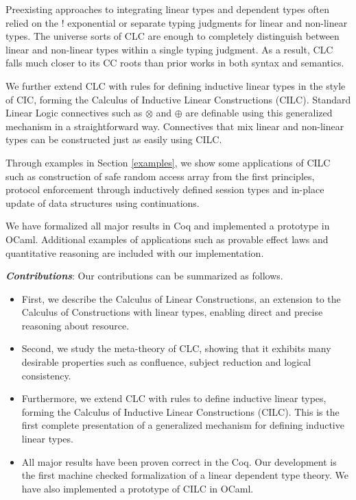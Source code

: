\documentclass[sigplan,screen,review,anonymous]{acmart}
\begin{document}
Preexisting approaches to integrating linear types and dependent types often relied on the ! exponential or separate typing judgments for linear and non-linear types. The universe sorts of CLC are enough to completely distinguish between linear and non-linear types within a single typing judgment. As a result, CLC falls much closer to its CC roots than prior works in both syntax and semantics.

We further extend CLC with rules for defining inductive linear types in the style of CIC, forming the Calculus of Inductive Linear Constructions (CILC). Standard Linear Logic connectives such as $\otimes$ and $\oplus$ are definable using this generalized mechanism in a straightforward way. Connectives that mix linear and non-linear types can be constructed just as easily using CILC.

Through examples in Section \ref{examples}, we show some applications of CILC such as construction of safe random access array from the first principles, protocol enforcement through inductively defined session types and in-place update of data structures using continuations.

We have formalized all major results in Coq and implemented a prototype in OCaml. Additional examples of applications such as provable effect laws and quantitative reasoning are included with our implementation.

\vspace{4pt}
\noindent \textbf{\textit{Contributions}}:
Our contributions can be summarized as follows.
\begin{itemize}
  \item First, we describe the Calculus of Linear Constructions, an extension to the Calculus of Constructions with linear types, enabling direct and precise reasoning about resource.
  \item Second, we study the meta-theory of CLC, showing that it exhibits many desirable properties such as confluence, subject reduction and logical consistency.
  \item Furthermore, we extend CLC with rules to define inductive linear types, forming the Calculus of Inductive Linear Constructions (CILC). This is the first complete presentation of a generalized mechanism for defining inductive linear types.
  \item All major results have been proven correct in the Coq. Our development is the first machine checked formalization of a linear dependent type theory. We have also implemented a prototype of CILC in OCaml.
\end{itemize}
\end{document}
